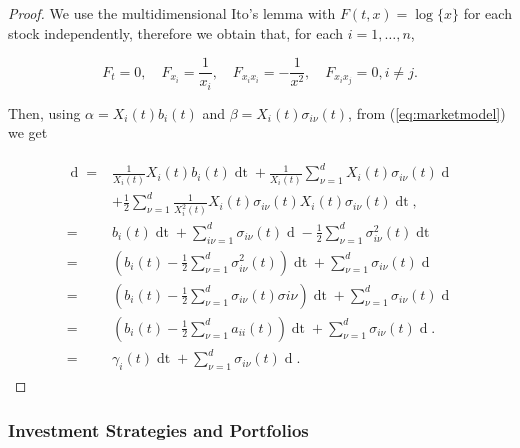\documentclass[british]{amsart} \usepackage{lmodern}
\numberwithin{equation}{section} \numberwithin{figure}{section}
\theoremstyle{plain} \newtheorem{thm}{\protect\theoremname}[section]
\theoremstyle{definition} \newtheorem{defn}[thm]{\protect\definitionname}
\theoremstyle{plain} \newtheorem{assumption}[thm]{\protect\assumptionname}
\theoremstyle{plain} \newtheorem{lem}[thm]{\protect\lemmaname}
\theoremstyle{plain} \newtheorem{prop}[thm]{\protect\propositionname}
\theoremstyle{remark} \newtheorem{rem}[thm]{\protect\remarkname}
\theoremstyle{plain} \newtheorem{cor}[thm]{\protect\corollaryname}
\renewcommand{\d}[1]{\mathop{\mathrm{d}{#1}}}
\newcommand{\rangei}{i=1,\dots,n} \newcommand{\measure}{\mathbb{P}}
\begin{document}
\begin{proof}

  We use the multidimensional Ito's lemma with $F(t,x)=\log\{x\}$ for each stock
  independently, therefore we obtain that, for each $\rangei$,

  \begin{equation}
    F_{t}=0, \quad F_{x_{i}}=\frac{1}{x_{i}}, \quad 
    F_{x_{i}x_{i}}=-\frac{1}{x^2}, \quad F_{x_{i}x_{j}}=0, i \neq j.
  \end{equation}

  Then, using $\alpha=X_{i}(t)b_{i}(t)$ and $\beta=X_{i}(t)\sigma_{i\nu}(t)$, 
  from (\ref{eq:marketmodel}) we get

  \begin{gather}
    \begin{split}
    \d{\log{X_{i}(t)}} 
        =& \frac{1}{X_{i}(t)} X_{i}(t)b_{i}(t)\d{t} 
            + \frac{1}{X_{i}(t)} \sum_{\nu=1}^d X_{i}(t)\sigma_{i\nu}(t)\d{W_{\nu}(t)} \\ 
        &
            + \frac{1}{2} \sum_{\nu=1}^d \frac{1}{X_{i}^2(t)} X_{i}(t)\sigma_{i\nu}(t) X_{i}(t)\sigma_{i\nu}(t) \d{t},\\
        =& b_{i}(t)\d{t} 
            + \sum_{i\nu=1}^d \sigma_{i\nu}(t) \d{W_{\nu}(t)}
             - \frac{1}{2} \sum_{\nu=1}^d \sigma^2_{i\nu}(t) \d{t} \\
        =& \left( b_{i}(t) - \frac{1}{2} \sum_{\nu=1}^d \sigma^2_{i\nu}(t) \right) \d{t} 
            + \sum_{\nu=1}^d \sigma_{i\nu}(t) \d{W_{\nu}(t)}\\
        =& \left( b_{i}(t) - \frac{1}{2} \sum_{\nu=1}^d \sigma_{i\nu}(t) \sigma{i\nu} \right) \d{t} 
            + \sum_{\nu=1}^d \sigma_{i\nu}(t) \d{W_{\nu}(t)}\\
        =& \left( b_{i}(t) - \frac{1}{2} \sum_{\nu=1}^d a_{ii}(t) \right) \d{t} 
            + \sum_{\nu=1}^d \sigma_{i\nu}(t) \d{W_{\nu}(t)}.\\
        =& \gamma_{i}(t) \d{t} + \sum_{\nu=1}^d \sigma_{i\nu}(t) \d{W_{\nu}(t)}.
   \end{split}
  \end{gather}

\end{proof}

\newpage
\subsubsection{Investment Strategies and Portfolios}
\end{document}
